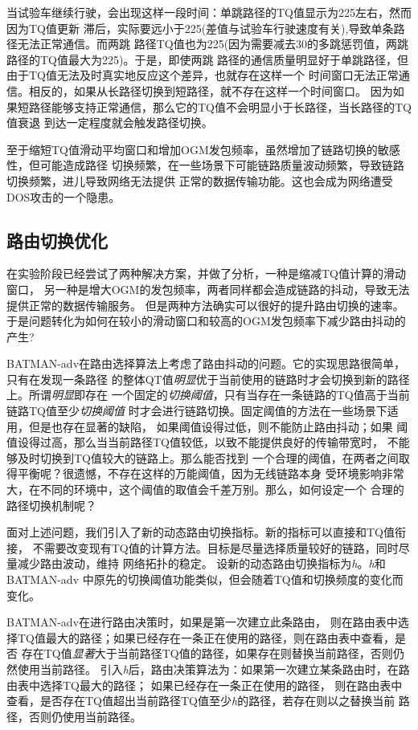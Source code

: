 当试验车继续行驶，会出现这样一段时间：单跳路径的TQ值显示为225左右，然而因为TQ值更新
滞后，实际要远小于225(差值与试验车行驶速度有关),导致单条路径无法正常通信。而两跳
路径TQ值也为225(因为需要减去30的多跳惩罚值，两跳路径的TQ值最大为225)。于是，即使两跳
路径的通信质量明显好于单跳路径，但由于TQ值无法及时真实地反应这个差异，也就存在这样一个
时间窗口无法正常通信。相反的，如果从长路径切换到短路径，就不存在这样一个时间窗口。
因为如果短路径能够支持正常通信，那么它的TQ值不会明显小于长路径，当长路径的TQ值衰退
到达一定程度就会触发路径切换。

至于缩短TQ值滑动平均窗口和增加OGM发包频率，虽然增加了链路切换的敏感性，但可能造成路径
切换频繁，在一些场景下可能链路质量波动频繁，导致链路切换频繁，进儿导致网络无法提供
正常的数据传输功能。这也会成为网络遭受DOS攻击的一个隐患。

\subsection{路由切换优化}
在实验阶段已经尝试了两种解决方案，并做了分析，一种是缩减TQ值计算的滑动窗口，
另一种是增大OGM的发包频率，两者同样都会造成链路的抖动，导致无法提供正常的数据传输服务。
但是两种方法确实可以很好的提升路由切换的速率。
于是问题转化为如何在较小的滑动窗口和较高的OGM发包频率下减少路由抖动的产生?

BATMAN-adv在路由选择算法上考虑了路由抖动的问题。它的实现思路很简单，只有在发现一条路径
的整体QT值\emph{明显}优于当前使用的链路时才会切换到新的路径上。所谓\emph{明显}即存在
一个固定的\emph{切换阈值}，只有当存在一条链路的TQ值高于当前链路TQ值至少\emph{切换阈值}
时才会进行链路切换。固定阈值的方法在一些场景下适用，但是也存在显著的缺陷，
如果阈值设得过低，则不能防止路由抖动；如果
阈值设得过高，那么当当前路径TQ值较低，以致不能提供良好的传输带宽时，
不能够及时切换到TQ值较大的链路上。那么能否找到
一个合理的阈值，在两者之间取得平衡呢？很遗憾，不存在这样的万能阈值，因为无线链路本身
受环境影响非常大，在不同的环境中，这个阈值的取值会千差万别。那么，如何设定一个
合理的路径切换机制呢？

面对上述问题，我们引入了新的动态路由切换指标。新的指标可以直接和TQ值衔接，
不需要改变现有TQ值的计算方法。目标是尽量选择质量较好的链路，同时尽量减少路由波动，维持
网络拓扑的稳定。
设新的动态路由切换指标为\emph{h}。\emph{h}和BATMAN-adv
中原先的切换阈值功能类似，但会随着TQ值和切换频度的变化而变化。

BATMAN-adv在进行路由决策时，如果是第一次建立此条路由，
则在路由表中选择TQ值最大的路径；如果已经存在一条正在使用的路径，则在路由表中查看，是否
存在TQ值\emph{显著}大于当前路径TQ值的路径，如果存在则替换当前路径，否则仍然使用当前路径。
引入\emph{h}后，路由决策算法为：如果第一次建立某条路由时，在路由表中选择TQ最大的路径；
如果已经存在一条正在使用的路径，
则在路由表中查看，是否存在TQ值超出当前路径TQ值至少\emph{h}的路径，若存在则以之替换当前
路径，否则仍使用当前路径。

